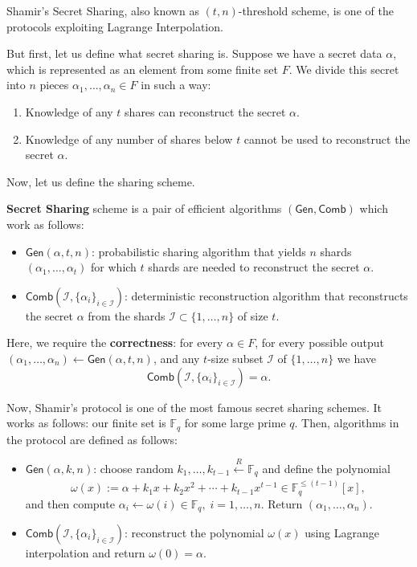 \documentclass[../lecture-notes.tex]{subfiles}
\begin{document}
Shamir's Secret Sharing, also known as $(t,n)$-threshold scheme, is one of the protocols exploiting Lagrange Interpolation. 

But first, let us define what secret sharing is. Suppose we have a secret data $\alpha$, which is represented as an element from some finite set $F$. We divide this secret into $n$ pieces $\alpha_1,\dots,\alpha_n \in F$ in such a way:
\begin{enumerate}
    \item Knowledge of any $t$ shares can reconstruct the secret $\alpha$.
    \item Knowledge of any number of shares below $t$ cannot be used to reconstruct the secret $\alpha$.
\end{enumerate}

Now, let us define the sharing scheme.

\begin{definition}
    \textbf{Secret Sharing} scheme is a pair of efficient algorithms $(\mathsf{Gen}, \mathsf{Comb})$ which work as follows:
    \begin{itemize}
        \item $\mathsf{Gen}(\alpha, t, n)$: probabilistic sharing algorithm that yields $n$ shards $(\alpha_1,\dots,\alpha_t)$ for which $t$ shards are needed to reconstruct the secret $\alpha$.
        \item $\mathsf{Comb}(\mathcal{I}, \{\alpha_i\}_{i \in \mathcal{I}})$: deterministic reconstruction algorithm that reconstructs the secret $\alpha$ from the shards $\mathcal{I} \subset \{1,\dots,n\}$ of size $t$.
    \end{itemize}

    Here, we require the \textbf{correctness}: for every $\alpha \in F$, for every possible output $(\alpha_1,\dots,\alpha_n) \gets \mathsf{Gen}(\alpha, t, n)$, and any $t$-size subset $\mathcal{I}$ of $\{1,\dots,n\}$ we have
    \begin{equation}
        \mathsf{Comb}(\mathcal{I}, \{\alpha_i\}_{i \in \mathcal{I}}) = \alpha.
    \end{equation}
\end{definition}

Now, Shamir's protocol is one of the most famous secret sharing schemes. It works as follows: our finite set is $\mathbb{F}_q$ for some large prime $q$. Then, algorithms in the protocol are defined as follows:
\begin{itemize}
    \item $\mathsf{Gen}(\alpha, k, n)$: choose random $k_1,\dots,k_{t-1} \xleftarrow[]{R} \mathbb{F}_q$ and define the polynomial
    \begin{equation}
        \omega(x) := \alpha + k_1x + k_2x^2 + \cdots + k_{t-1}x^{t-1} \in \mathbb{F}_q^{\leq (t-1)}[x],     
    \end{equation}
    and then compute $\alpha_i \gets \omega(i) \in \mathbb{F}_q, \; i = 1,\dots,n$. Return $(\alpha_1,\dots,\alpha_n)$.
    \item $\mathsf{Comb}(\mathcal{I}, \{\alpha_i\}_{i \in \mathcal{I}})$: reconstruct the polynomial $\omega(x)$ using Lagrange interpolation and return $\omega(0) = \alpha$.
\end{itemize}
\end{document}
